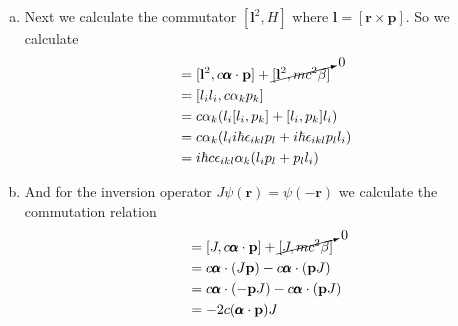 \documentclass[11pt]{article}
\numberwithin{equation}{section}
\begin{document}
\begin{enumerate}[(a)]
\begin{align*}
\begin{array}{cc}
       \sigma_kp_k &-mcI
        \end{array}\right)
 \left(\begin{array}{cc}
                   0    &-I\\
                   -I    &0\\
               \end{array}\right)\\
&= -c\left(\begin{array}{cc}
         \sigma_kp_k      &-mcI\\
         mcI              &\sigma_kp_k
     \end{array}\right)
+ c\left(\begin{array}{cc}
         \sigma_kp_k      &mcI\\
         -mcI              &\sigma_kp_k
     \end{array}\right)\\
&= 2mc^2\left(\begin{array}{cc}
         0    &I\\
         -I   &0
     \end{array}\right)
\end{align*}

\item Next we calculate the commutator $[\mathbf{l}^2,H]$ where 
$\mathbf{l} = [\mathbf{r}\times\mathbf{p}]$. So we calculate
\begin{align*}
[\mathbf{l}^2,H] &= [\mathbf{l}^2,c\pmb{\alpha}\cdot\mathbf{p}] + \cancelto{0}{[\mathbf{l}^2,mc^2\beta]}\\
&= [l_il_i,c\alpha_kp_k]\\
&= c\alpha_k(l_i[l_i,p_k] + [l_i,p_k]l_i)\\
&= c\alpha_k(l_ii\hbar\epsilon_{ikl}p_{l} + i\hbar\epsilon_{ikl}p_ll_i)\\
&= i\hbar{c}\epsilon_{ikl}\alpha_k(l_ip_{l} + p_ll_i)
\end{align*}

\item And for the inversion operator $J\psi(\mathbf{r}) = \psi(-\mathbf{r})$ we calculate the
commutation relation
\begin{align*}
[J,H] &= [J,c\pmb{\alpha}\cdot\mathbf{p}] + \cancelto{0}{[J,mc^2\beta]}\\
&= c\pmb{\alpha}\cdot(J\mathbf{p}) - c\pmb{\alpha}\cdot(\mathbf{p}J) \\
&= c\pmb{\alpha}\cdot(-\mathbf{p}J) - c\pmb{\alpha}\cdot(\mathbf{p}J) \\
&= -2c(\pmb{\alpha}\cdot\mathbf{p})J
\end{align*}
\end{enumerate}
\pagebreak
\end{document}
